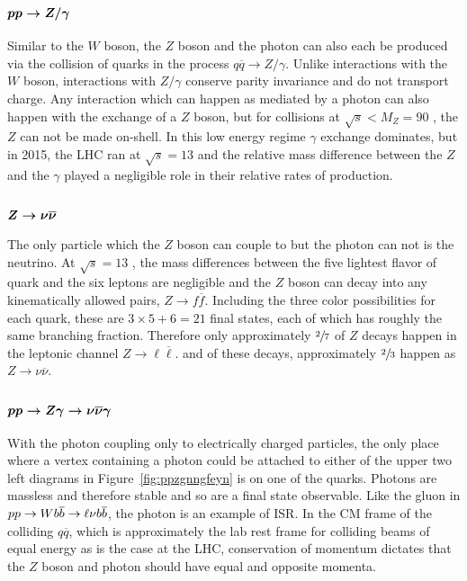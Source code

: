  \subsection[\ppzsg]
 {$\boldsymbol{pp\rightarrow Z/\gamma}$}

 Similar to the $W$ boson, the $Z$ boson and the photon can
  also each be produced via the collision of quarks in
  the process $q\overline{q} \rightarrow Z/\gamma$.
 Unlike interactions with the $W$ boson, 
  interactions with $Z/\gamma$ conserve parity invariance
  and do not transport charge.
 Any interaction which can happen as mediated
  by a photon can also happen with the exchange
  of a $Z$ boson, but for collisions at $\sqrt{s}<M_Z = 90$ \GeV,
  the $Z$ can not be made on-shell.
 In this low energy regime $\gamma$ exchange dominates,
  but in 2015, the LHC ran at $\sqrt{s}=13$ \TeV
  and the relative mass difference between the $Z$ and the $\gamma$
  played a negligible role in their relative rates of production. 


 \subsection[\znn]
 {$\boldsymbol{Z\rightarrow\nu\overline{\nu}}$}

 The only particle which the $Z$ boson can couple to 
  but the photon can not is the neutrino.
 At $\sqrt{s}=13$ \TeV, the mass differences between
  the five lightest flavor of quark and the six 
  leptons are negligible and the $Z$ boson
  can decay into any kinematically allowed pairs,
  $Z\rightarrow f\overline{f}$.
 Including the three color possibilities
  for each quark, these are $3\times 5 + 6 = 21$ final states,
  each of which has roughly the same branching
  fraction. 
 Therefore only approximately $\sfrac{2}{7}$ of $Z$
  decays happen in the leptonic channel $Z\rightarrow \ell \overline{\ell}$.
  and of these decays, approximately $\sfrac{2}{3}$ happen
  as $Z\rightarrow \nu\overline{\nu}$.

 \subsection[\ppzgnng]
 {$\boldsymbol{pp\rightarrow Z\gamma\rightarrow\nu\overline{\nu}\gamma}$}

 With the photon coupling only to 
  electrically charged particles,
  the only place where a vertex
  containing a photon could be attached to
  either of the upper two left diagrams
  in Figure~\ref{fig:ppzgnngfeyn}
  is on one of the quarks.
 Photons are massless and therefore stable
  and so are a final state observable.
 Like the gluon in $pp\rightarrow Wb\overline{b}\rightarrow\ell\nu b\overline{b}$,
  the photon is an example of ISR.
 In the CM frame of the colliding $q\overline{q}$,
  which is approximately the lab rest frame
  for colliding beams of equal energy as is the
  case at the LHC,
  conservation of momentum dictates
  that the $Z$ boson and photon should have 
  equal and opposite momenta.

